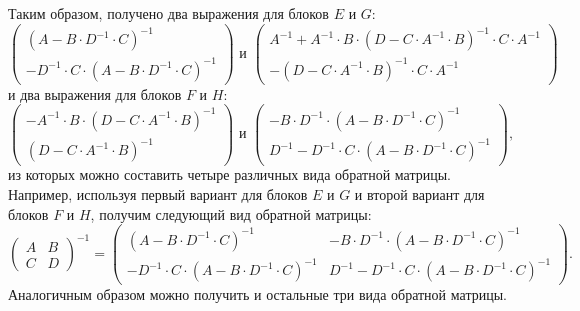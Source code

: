 Таким образом, получено два выражения для блоков $E$ и $G$:
$$
	\begin{pmatrix}
		\left ( A - B \cdot D^{-1} \cdot C \right )^{-1} \\
		- D^{-1} \cdot C \cdot \left ( A - B \cdot D^{-1} \cdot C \right )^{-1}
	\end{pmatrix}
	\text{ и }
	\begin{pmatrix}
		A^{-1} + A^{-1} \cdot B \cdot \left ( D - C \cdot A^{-1} \cdot B \right )^{-1} \cdot C \cdot A^{-1} \\
		- \left ( D - C \cdot A^{-1} \cdot B \right )^{-1} \cdot C \cdot A^{-1}
	\end{pmatrix}
$$
и два выражения для блоков $F$ и $H$:
$$
	\begin{pmatrix}
		- A^{-1} \cdot B \cdot \left ( D - C \cdot A^{-1} \cdot B \right )^{-1} \\
		\left ( D - C \cdot A^{-1} \cdot B \right )^{-1}
	\end{pmatrix}
	\text{ и }
	\begin{pmatrix}
		- B \cdot D^{-1} \cdot \left ( A - B \cdot D^{-1} \cdot C \right )^{-1} \\
		D^{-1} - D^{-1} \cdot C \cdot \left ( A - B \cdot D^{-1} \cdot C \right )^{-1}
	\end{pmatrix}
	,
$$
из которых можно составить четыре различных вида обратной матрицы. Например, используя первый вариант для блоков $E$ и $G$ и второй вариант для блоков $F$ и $H$,
получим следующий вид обратной матрицы:
$$
	\begin{pmatrix}
		A & B \\
		C & D
	\end{pmatrix}^{-1}
	=
	\begin{pmatrix}
		\left ( A - B \cdot D^{-1} \cdot C \right )^{-1}                        & - B \cdot D^{-1} \cdot \left ( A - B \cdot D^{-1} \cdot C \right )^{-1} \\
		- D^{-1} \cdot C \cdot \left ( A - B \cdot D^{-1} \cdot C \right )^{-1} & D^{-1} - D^{-1} \cdot C \cdot \left ( A - B \cdot D^{-1} \cdot C \right )^{-1}
	\end{pmatrix}
	.
$$
Аналогичным образом можно получить и остальные три вида обратной матрицы.

